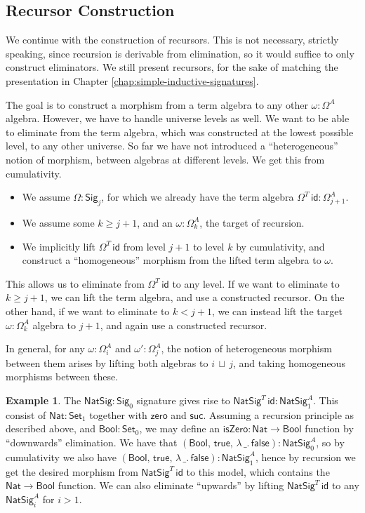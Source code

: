 \documentclass[12pt,a4paper,twoside,openany]{book}
\theoremstyle{remark}
\theoremstyle{definition}
\newtheorem{myexample}{Example}
\theoremstyle{theorem}
\newcommand{\ms}[1]{\mathsf{#1}}
\newcommand{\zero}{\ms{zero}}
\newcommand{\suc}{\ms{suc}}
\newcommand{\id}{\mathsf{id}}
\newcommand{\Set}{\mathsf{Set}}
\newcommand{\Sig}{\mathsf{Sig}}
\newcommand{\Nat}{\ms{Nat}}
\newcommand{\Bool}{\ms{Bool}}
\newcommand{\true}{\ms{true}}
\newcommand{\false}{\ms{false}}
\newcommand{\lub}{\,\sqcup\,}
\begin{document}
\subsection{Recursor Construction}

We continue with the construction of recursors. This is not necessary, strictly
speaking, since recursion is derivable from elimination, so it would suffice to
only construct eliminators. We still present recursors, for the sake of matching
the presentation in Chapter \ref{chap:simple-inductive-signatures}.

The goal is to construct a morphism from a term algebra to any other $\omega :
\Omega^A$ algebra. However, we have to handle universe levels as well. We want
to be able to eliminate from the term algebra, which was constructed at the
lowest possible level, to any other universe. So far we have not introduced a
``heterogeneous'' notion of morphism, between algebras at different levels. We
get this from cumulativity.
\begin{itemize}
  \item We assume $\Omega : \Sig_j$, for which we already have the term algebra $\Omega^T\,\id : \Omega^A_{j+1}$.
  \item We assume some $k \geq j + 1$, and an $\omega : \Omega^A_{k}$, the target of recursion.
  \item We implicitly lift $\Omega^T\,\id$ from level $j + 1$ to level $k$ by cumulativity, and construct
        a ``homogeneous'' morphism from the lifted term algebra to $\omega$.
\end{itemize}
This allows us to eliminate from $\Omega^T\,\id$ to any level. If we want to
eliminate to $k \geq j + 1$, we can lift the term algebra, and use a constructed
recursor. On the other hand, if we want to eliminate to $k < j + 1$, we can
instead lift the target $\omega : \Omega^A_{k}$ algebra to $j + 1$, and again
use a constructed recursor.

In general, for any $\omega : \Omega^A_{i}$ and $\omega' : \Omega^A_{j}$, the
notion of heterogeneous morphism between them arises by lifting both algebras to
$i \lub j$, and taking homogeneous morphisms between these.

\begin{myexample}
The $\ms{NatSig} : \Sig_0$ signature gives rise to $\ms{NatSig}^T\,\id :
\ms{NatSig}^A_1$. This consist of $\ms{Nat} : \Set_1$ together with $\zero$ and
$\suc$. Assuming a recursion principle as described above, and $\Bool : \Set_0$,
we may define an $\ms{isZero} : \Nat \to \Bool$ function by ``downwards''
elimination.  We have that $(\Bool,\,\true,\,\lambda\,\_.\,\false) :
\ms{NatSig}^A_0$, so by cumulativity we also have
$(\Bool,\,\true,\,\lambda\,\_.\,\false) : \ms{NatSig}^A_1$, hence by recursion
we get the desired morphism from $\ms{NatSig}^T\,\id$ to this model, which
contains the $\Nat \to \Bool$ function. We can also eliminate ``upwards'' by
lifting $\ms{NatSig}^T\,\id$ to any $\ms{NatSig}^A_i$ for $i > 1$.
\end{myexample}
\end{document}
